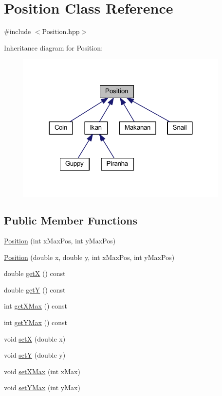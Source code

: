 \hypertarget{class_position}{}\section{Position Class Reference}
\label{class_position}


{\ttfamily \#include $<$Position.\+hpp$>$}



Inheritance diagram for Position\+:\nopagebreak
\begin{figure}[H]
\begin{center}
\leavevmode
\includegraphics[width=300pt]{class_position__inherit__graph}
\end{center}
\end{figure}
\subsection*{Public Member Functions}
\begin{DoxyCompactItemize}
\item 
\mbox{\hyperlink{class_position_a64f68cd96fa0eedccbb760143b82442a}{Position}} (int x\+Max\+Pos, int y\+Max\+Pos)
\item 
\mbox{\hyperlink{class_position_ace954f29b47b5324517ea8ed2487c949}{Position}} (double x, double y, int x\+Max\+Pos, int y\+Max\+Pos)
\item 
double \mbox{\hyperlink{class_position_a10a2a09ec64310f42138f98238ec5fbd}{getX}} () const
\item 
double \mbox{\hyperlink{class_position_a83ae4a9db1a4f29e5a43e5592b65f095}{getY}} () const
\item 
int \mbox{\hyperlink{class_position_abc0b7856e25fab037f1dbfb543ec96cf}{get\+X\+Max}} () const
\item 
int \mbox{\hyperlink{class_position_a6796150fb51e6d8760a5d025b09d1ca5}{get\+Y\+Max}} () const
\item 
void \mbox{\hyperlink{class_position_af12bdfae6a9ccecfc31d968de3613a1d}{setX}} (double x)
\item 
void \mbox{\hyperlink{class_position_a5fbae78d4986da56edad357a82e1e376}{setY}} (double y)
\item 
void \mbox{\hyperlink{class_position_acb2c50493422d1a6faceb3ed7e2a8caf}{set\+X\+Max}} (int x\+Max)
\item 
void \mbox{\hyperlink{class_position_a715321d96c4195ddb3381b52a6cf547c}{set\+Y\+Max}} (int y\+Max)
\end{DoxyCompactItemize}



